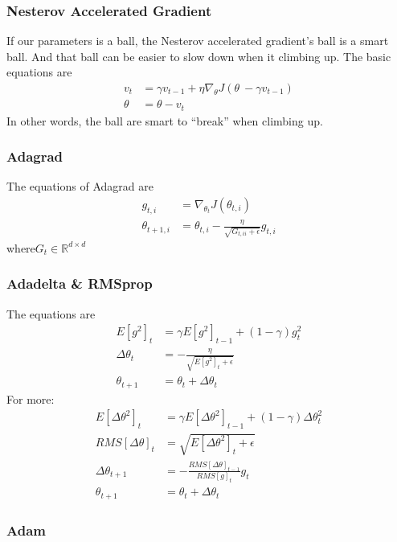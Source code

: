 \documentclass{article}
\begin{document}
\subsubsection{Nesterov Accelerated Gradient}
\label{sec:gd:gdoa:nag}

If our parameters is a ball, the Nesterov accelerated gradient's ball is a smart ball. And that ball can be easier to slow down when it climbing up.
The basic equations are
\begin{align*}
v_t &= \gamma v_{t-1} + \eta\nabla_\theta J(\theta\ -\gamma v_{t-1}) \\
\theta &= \theta - v_t
\end{align*}
In other words, the ball are smart to ``break'' when climbing up.

\subsubsection{Adagrad}
\label{sec:gd:gdoa:adarad}

The equations of Adagrad are
\begin{align*}
g_{t,i} &= \nabla_{\theta_t}J(\theta_{t,i}) \\
\theta_{t+1,i} &= \theta_{t,i} - \frac{\eta}{\sqrt{G_{t,ii}+\epsilon}} g_{t,i}
\end{align*}
where$G_t\in \mathbb{R}^{d\times d}$

\subsubsection{Adadelta \& RMSprop}
\label{sec:gd:gdoa:adadelta}

The equations are
\begin{align*}
E[g^2]_t &= \gamma E[g^2]_{t-1} + (1-\gamma)g_t^2 \\
\Delta\theta_t & = - \frac{\eta}{\sqrt{E[g^2]_t + \epsilon}} \\
\theta_{t+1} &= \theta_t + \Delta \theta_t
\end{align*}
For more:
\begin{align*}
E[\Delta\theta^2]_t &= \gamma E[\Delta\theta^2]_{t-1} + (1-\gamma)\Delta\theta_t^2 \\
RMS[\Delta\theta]_t &= \sqrt{E[\Delta\theta^2]_t+\epsilon} \\
\Delta\theta_{t+1}& = -\frac{RMS[\Delta\theta]_{t-1}}{RMS[g]_t}g_t \\
\theta_{t+1} &= \theta_t + \Delta\theta_t
\end{align*}

\subsubsection{Adam}
\label{sec:gd:gdoa:adam}
\end{document}
